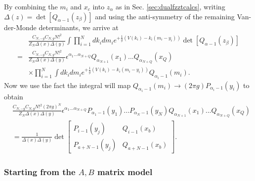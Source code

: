 \documentclass[english]{article}
\begin{document}
By combining the $m_{i}$ and $x_{c}$ into $z_{\alpha}$ as in Sec. \ref{sec:dualfzztcalcs}, writing $\Delta(z)= \det\left[ Q_{\alpha -1}(z_{\beta})\right]$ and using the anti-symmetry of the remaining Van-der-Monde determinants, we arrive at  
\begin{align}
   & \frac{C_{N,-g}C_{N,g} N!^2}{Z_{N} \Delta(x) \Delta(y)}\int \prod_{i=1}^{N} dk_{i} dm_{i}  e^{+\frac{1}{g}\left( V(k_{i})-k_{i}(m_{i}-y_{i}) \right)} \det\left[ Q_{\alpha -1}(z_{\beta})\right] \\
      = & \frac{C_{N,-g}C_{N,g} N!^2}{Z_{N}\Delta(x) \Delta(y)} \epsilon^{\alpha_{1}...\alpha_{N+Q}} Q_{\alpha_{N+1}}(x_1)...Q_{\alpha_{N+Q}}(x_{Q}) \\
     &  \times \prod_{i=1}^{N} \int dk_{i} dm_{i}  e^{+\frac{1}{g}\left( V(k_{i})-k_{i}(m_{i}-y_{i}) \right)} Q_{\alpha_{i}-1}(m_{i}).
\end{align}
Now we use the fact the integral will map $Q_{\alpha_{i}-1}(m_{i}) \rightarrow (2\pi g)P_{\alpha_{i}-1}(y_{i})$ to obtain
\begin{align}
   & \frac{C_{N,-g}C_{N,g} N!^2 (2\pi g)^{N}}{Z_{N}\Delta(x) \Delta(y)} \epsilon^{\alpha_{1}...\alpha_{N+Q}} P_{\alpha_{1}-1}(y_{1})...P_{\alpha_{N}-1}(y_{N}) Q_{\alpha_{N+1}}(x_1)...Q_{\alpha_{N+Q}}(x_{Q})\\
   & = \boxed{\frac{1}{\Delta(x) \Delta(y)} \det \left[ \begin{array}{c|c} 
    P_{i-1}(y_{j}) & Q_{i-1}(x_{b}) \\ \hline
    P_{a+N-1}(y_{j}) & Q_{a+N-1}(x_{b}) 
    \end{array}\right]}.
\end{align}

\subsubsection{Starting from the $A,B$ matrix model}
\end{document}
